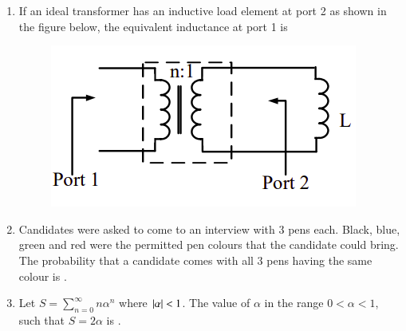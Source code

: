 \documentclass[journal,12pt,onecolumn]{IEEEtran}
\theoremstyle{remark}
\begin{document}
\begin{enumerate}[start=1, label=Q.\arabic*]
\begin{figure}[H]
    \end{figure}

    \hfill{}

    \item If an ideal transformer has an inductive load element at port 2 as shown in the figure below, the equivalent inductance at port 1 is
    \begin{figure}[H]
        \includegraphics[width=0.5\columnwidth]{Figures/q25.png}
        \centering
        \caption{}
    \end{figure}
    \begin{enumerate}
    \end{enumerate}

    \hfill{}

    \item Candidates were asked to come to an interview with $3$ pens each. Black, blue, green and red were the permitted pen colours that the candidate could bring. The probability that a candidate comes with all $3$ pens having the same colour is \underline{\hspace{2cm}}.

    \hfill{}

    \item Let $S=\sum_{n=0}^{\infty}n\alpha^{n}$ where $\left\vert\alpha\right\vert<1$. The value of $\alpha$ in the range $0<\alpha<1$, such that $S=2\alpha$ is \underline{\hspace{2cm}}.

    \hfill{}


\end{enumerate}
\end{document}
